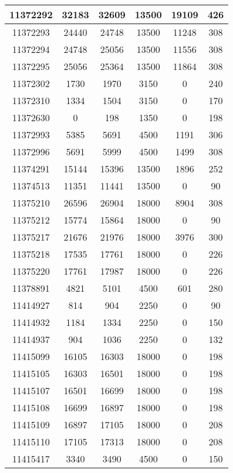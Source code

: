 \begin{appendices}
\begin{center}
\begin{longtable}{|c|c|c|c|c|c|}
11372292 & 32183 & 32609 & 13500 & 19109 & 426 \\ \hline
11372293 & 24440 & 24748 & 13500 & 11248 & 308 \\ \hline
11372294 & 24748 & 25056 & 13500 & 11556 & 308 \\ \hline
11372295 & 25056 & 25364 & 13500 & 11864 & 308 \\ \hline
11372302 & 1730  & 1970  & 3150  & 0     & 240 \\ \hline
11372310 & 1334  & 1504  & 3150  & 0     & 170 \\ \hline
11372630 & 0     & 198   & 1350  & 0     & 198 \\ \hline
11372993 & 5385  & 5691  & 4500  & 1191  & 306 \\ \hline
11372996 & 5691  & 5999  & 4500  & 1499  & 308 \\ \hline
11374291 & 15144 & 15396 & 13500 & 1896  & 252 \\ \hline
11374513 & 11351 & 11441 & 13500 & 0     & 90  \\ \hline
11375210 & 26596 & 26904 & 18000 & 8904  & 308 \\ \hline
11375212 & 15774 & 15864 & 18000 & 0     & 90  \\ \hline
11375217 & 21676 & 21976 & 18000 & 3976  & 300 \\ \hline
11375218 & 17535 & 17761 & 18000 & 0     & 226 \\ \hline
11375220 & 17761 & 17987 & 18000 & 0     & 226 \\ \hline
11378891 & 4821  & 5101  & 4500  & 601   & 280 \\ \hline
11414927 & 814   & 904   & 2250  & 0     & 90  \\ \hline
11414932 & 1184  & 1334  & 2250  & 0     & 150 \\ \hline
11414937 & 904   & 1036  & 2250  & 0     & 132 \\ \hline
11415099 & 16105 & 16303 & 18000 & 0     & 198 \\ \hline
11415105 & 16303 & 16501 & 18000 & 0     & 198 \\ \hline
11415107 & 16501 & 16699 & 18000 & 0     & 198 \\ \hline
11415108 & 16699 & 16897 & 18000 & 0     & 198 \\ \hline
11415109 & 16897 & 17105 & 18000 & 0     & 208 \\ \hline
11415110 & 17105 & 17313 & 18000 & 0     & 208 \\ \hline
11415417 & 3340  & 3490  & 4500  & 0     & 150 \\ \hline

\end{longtable}
\end{center}
\end{appendices}
